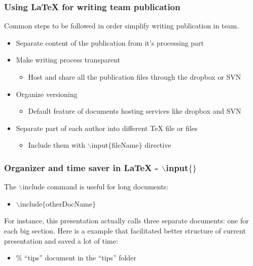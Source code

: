 \begin{frame}  \frametitle{Using LaTeX for writing \textbf{team} publication}
	
	Common steps to be followed in order simplify writing publication in team.
	
	\vspace{0.4cm}
	
	
	\begin{itemize}	
		\item Separate content of the publication from it's processing part
		\item Make writing process transparent
		\begin{itemize}
			\item Host and share all the publication files through the dropbox or SVN
		\end{itemize}
		\item Organize versioning
		\begin{itemize}
			\item Default feature of documents hosting services like dropbox and SVN
		\end{itemize}
		\item Separate part of each author into different TeX file or files
		\begin{itemize}
			\item Include them with {\color{command}$\backslash$input\color{braces}$\{${\color{black}fileName}$\}$\color{black}} directive
		\end{itemize}
	\end{itemize}
\end{frame}


\begin{frame}  \frametitle{Organizer and time saver in LaTeX - {\color{command}$\backslash$input\color{braces}$\{${\color{black}}$\}$\color{black}}}
	The {\color{command}$\backslash$include} command is useful for long documents:
	\vspace{1mm} \\
	\begin{itemize}
		\item[] {\color{command}$\backslash$include}{\color{braces}$\{${\color{black}otherDocName}$\}$}
	\end{itemize}
	\vspace{1mm}
	For instance, this presentation actually calls three separate documents: one for each big section. Here is a example that facilitated better structure of current presentation and saved a lot of time:
	\vspace{1mm} \\
	\begin{itemize}
		\item[]  {\color{red}\% ``tips'' document in the ``tips'' folder}
	\end{itemize}
\end{frame}



